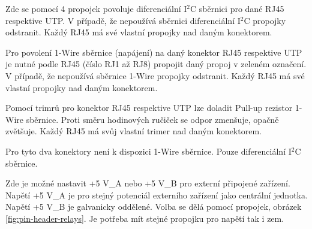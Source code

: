 \begin{Czech}
\end{Czech}

\begin{Czech}
Zde se pomocí 4 propojek povoluje diferenciální I$^2$C sběrnici pro dané RJ45 respektive UTP. V případě, že nepoužívá sběrnici diferenciální I$^2$C propojky odstranit. Každý RJ45 má své vlastní propojky nad daným konektorem.
\end{Czech}

\begin{Czech}
\end{Czech}

\begin{Czech}
Pro povolení 1-Wire sběrnice (napájení) na daný konektor RJ45 respektive UTP je nutné podle RJ45 (číslo RJ1 až RJ8) propojit daný propoj v zeleném označení. V případě, že nepoužívá sběrnice 1-Wire propojky odstranit. Každý RJ45 má své vlastní propojky nad daným konektorem.
\end{Czech}

\begin{Czech}
\end{Czech}

\begin{Czech}
Pomocí trimrů pro konektor RJ45 respektive UTP lze doladit Pull-up rezistor 1-Wire sběrnice. Proti směru hodinových ručiček se odpor zmenšuje, opačně zvětšuje. Každý RJ45 má svůj vlastní trimer nad daným konektorem.
\end{Czech}

\begin{Czech}
\end{Czech}

\begin{Czech}
Pro tyto dva konektory není k dispozici 1-Wire sběrnice. Pouze diferenciální I$^2$C sběrnice.
\end{Czech}

\begin{Czech}
\end{Czech}

\begin{Czech}
Zde je možné nastavit +5 V\_A nebo +5 V\_B pro externí připojené zařízení. Napětí +5 V\_A je pro stejný potenciál externího zařízení jako centrální jednotka. Napětí +5 V\_B je galvanicky oddělené. Volba se dělá pomocí propojek, obrázek \ref{fig:pin-header-relays}. Je potřeba mít stejné propojku pro napětí tak i zem.
\end{Czech}

